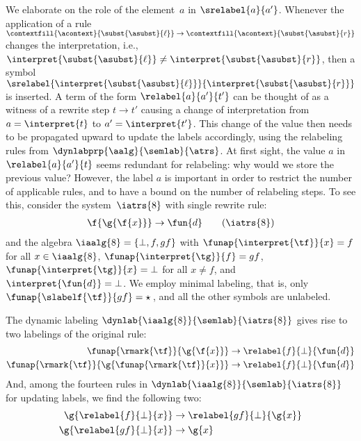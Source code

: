 \begin{remark}
\newcommand{\ssrelabelto}{\ssrelabel}\newcommand{\srelabelto}{\super{\ssrelabelto}}\newcommand{\relabelto}[1]{\funap{\srelabelto{#1}}}\newcommand{\fgfxnr}{8}\newcommand{\trsfgfx}{\iatrs{\fgfxnr}}\newcommand{\algfgfx}{\iaalg{\fgfxnr}}We elaborate on the role of the element~$a$ in $\srelabel{a}{a'}$.
  Whenever the application of a rule 
  $\contextfill{\acontext}{\subst{\asubst}{\ell}} \to \contextfill{\acontext}{\subst{\asubst}{r}}$ 
  changes the interpretation,
  i.e., $\interpret{\subst{\asubst}{\ell}} \neq \interpret{\subst{\asubst}{r}}$,
  then a symbol $\srelabel{\interpret{\subst{\asubst}{\ell}}}{\interpret{\subst{\asubst}{r}}}$ is inserted.
  A term of the form $\relabel{a}{a'}{t'}$ can be thought of as a witness 
  of a rewrite step $t\to t'$ 
  causing a change of interpretation from $a = \interpret{t}$ to $a' = \interpret{t'}$.
  This change of the value then needs to be propagated upward to update the labels accordingly,
  using the relabeling rules from $\dynlabprp{\aalg}{\semlab}{\atrs}$.
  At first sight, the value $a$ in $\relabel{a}{a'}{t}$ seems redundant for relabeling:
  why would we store the previous value? 
  However, the label $a$ is important in order to restrict the number of applicable rules,
  and to have a bound on the number of relabeling steps. 
  To see this, consider the system~$\trsfgfx$ with single rewrite rule:
\begin{align}
    \f{\g{\f{x}}} \to \fun{d}
    \tag{$\trsfgfx$}
    \label{ex:fgfx}
  \end{align}
  and the algebra $\algfgfx = \{ \bot, f, \mit{gf} \}$ with
  $\funap{\interpret{\tf}}{x} = f$ for all $x \in \algfgfx$,
  $\funap{\interpret{\tg}}{\mit{f}} = \mit{gf}$, $\funap{\interpret{\tg}}{x} = \bot$ for all $x \ne f$,
  and $\interpret{\fun{d}} = \bot$.
  We employ minimal labeling, that is, 
  only $\funap{\slabelf{\tf}}{\mit{gf}} = \star$\,,
  and all the other symbols are unlabeled.
  
  The dynamic labeling $\dynlab{\algfgfx}{\semlab}{\trsfgfx}$ gives rise to two labelings of the original rule:
  \begin{align}
    \funap{\rmark{\tf}}{\g{\f{x}}} &\to \relabel{f}{\bot}{\fun{d}}
    \label{rule:fgfx:dynlab:1}
    \\
    \funap{\rmark{\tf}}{\g{\funap{\rmark{\tf}}{x}}} &\to \relabel{f}{\bot}{\fun{d}}
    \label{rule:fgfx:dynlab:2}
  \end{align}
  And, among the fourteen rules in $\dynlab{\algfgfx}{\semlab}{\trsfgfx}$ for updating labels,
  we find the following two:
  \begin{align}
    \g{\relabel{f}{\bot}{x}} &\to \relabel{\mit{gf}}{\bot}{\g{x}}
    \label{rule:fgfx:dynlab:3}
    \\ 
    \g{\relabel{\mit{gf}}{\bot}{x}} &\to \g{x}
    \label{rule:fgfx:dynlab:4}
  \end{align}


\end{remark}
